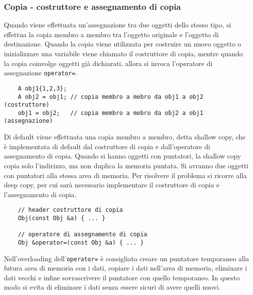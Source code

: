 \documentclass[a4paper]{article}
\begin{document}
\subsubsection*{Copia - costruttore e assegnamento di copia}
Quando viene effettuata un'assegnazione tra due oggetti dello stesso tipo, si effettua la copia membro a membro tra l'oggetto
originale e l'oggetto di destinazione. Quando la copia viene utilizzata per costruire un nuovo oggetto o inizializzare una
variabile viene chiamato il costruttore di copia, mentre quando la copia coinvolge oggetti già dichiarati, allora si invoca
l'operatore di assegnazione \verb|operator=|.
\begin{lstlisting}
	A obj1{1,2,3};
	A obj2 = obj1; // copia membro a mebro da obj1 a obj2 (costruttore)
	obj1 = obj2;   // copia membro a mebro da obj2 a obj1 (assegnazione)
\end{lstlisting}
Di default viene effettuata una copia membro a membro, detta shallow copy, che è implementata di default dal costruttore di copia
e dall'operatore di assegnamento di copia. Quando si hanno oggetti con puntatori, la shallow copy copia solo l'indirizzo, ma non
duplica la memoria puntata. Si avranno due oggetti con puntatori alla stessa area di memoria. Per risolvere il problema si ricorre
alla deep copy, per cui sarà necessario implementare il costruttore di copia e l'assegnamento di copia.
\begin{lstlisting}
	// header costruttore di copia
	Obj(const Obj &a) { ... }

	// operatore di assegnamento di copia
	Obj &operator=(const Obj &a) { ... }
\end{lstlisting}
Nell'overloading dell'\verb|operator=| è consigliato creare un puntatore temporaneo alla futura area di memoria con i dati, copiare
i dati nell'area di memoria, eliminare i dati vecchi e infine sovrascrivere il puntatore con quello temporaneo. In questo modo si
evita di eliminare i dati senza essere sicuri di avere quelli nuovi.
\end{document}
